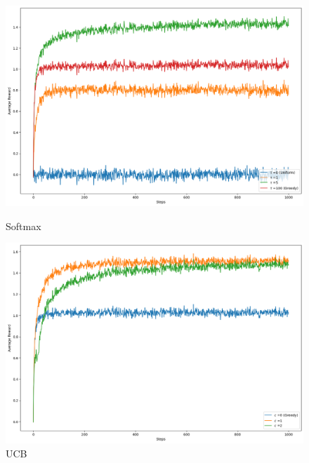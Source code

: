 \begin{figure}[H]
\vspace{-1.5cm}
    \centering
   \begin{minipage}{\linewidth}
        \centering
        \includegraphics[width=\linewidth, height=0.33\textheight]{images/bandit_softmax.png}
        \caption{Softmax}
    \end{minipage}
    
    
    \vspace{0.5mm} %
    
     \begin{minipage}{\linewidth}
        \centering
        \includegraphics[width=\linewidth, height=0.33\textheight]{images/bandit_ucb.png}
        \caption{UCB}
    \end{minipage}
    
    
    \vspace{0.5mm}
    

\end{figure}
